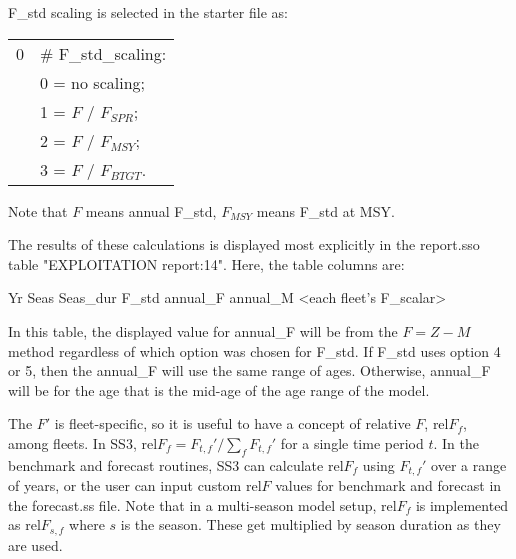 F\_std scaling is selected in the starter file as:
\begin{center}
	\begin{longtable}{p{2cm} p{12cm}}
		\hline
		0 & \# F\_std\_scaling: \Tstrut\\
		& 0 = no scaling; \\
		& 1 = $F$ / $F_{SPR}$; \\ 
		& 2 = $F$ / $F_{MSY}$; \\
		& 3 = $F$ / $F_{BTGT}$.\Bstrut\\
		\hline
	\end{longtable}
	\vspace*{-1.7\baselineskip}
\end{center}

Note that $F$ means annual F\_std, $F_{MSY}$ means F\_std at MSY.

The results of these calculations is displayed most explicitly in the report.sso table "EXPLOITATION report:14". Here, the table columns are:

Yr Seas Seas\_dur F\_std annual\_F annual\_M <each fleet's F\_scalar>

In this table, the displayed value for annual\_F will be from the $F=Z-M$ method regardless of which option was chosen for F\_std.  If F\_std uses option 4 or 5, then the annual\_F will use the same range of ages. Otherwise, annual\_F will be for the age that is the mid-age of the age range of the model.



The $F'$ is fleet-specific, so it is useful to have a concept of relative $F$, $\text{rel}F_f$, among fleets. In SS3, $\text{rel}F_f= F_{t,f}'/\sum_{f}^{}F_{t,f}'$ for a single time period $t$. In the benchmark and forecast routines, SS3 can calculate $\text{rel}F_f$ using $F_{t,f}'$ over a range of years, or the user can input custom $\text{rel}F$ values for benchmark and forecast in the forecast.ss file. Note that in a multi-season model setup, $\text{rel}F_f$ is implemented as $\text{rel}F_{s,f}$ where $s$ is the season. These get multiplied by season duration as they are used.

